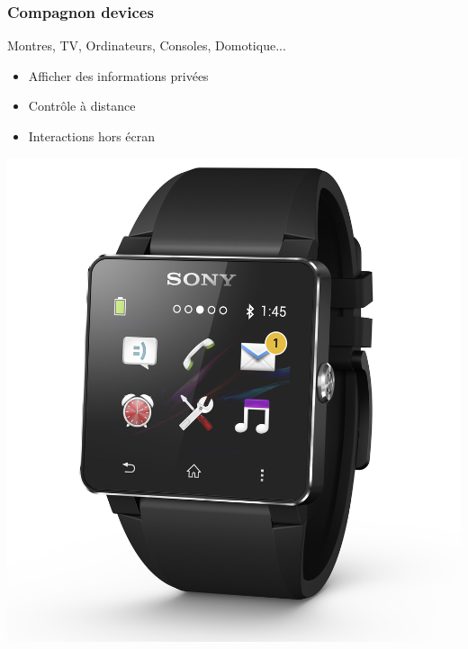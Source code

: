 \documentclass{beamer}
\begin{document}
\begin{frame}
\frametitle{Compagnon devices}

Montres, TV, Ordinateurs, Consoles, Domotique...

\begin{itemize}
		\item Afficher des informations privées
		\item Contrôle à distance
		\item Interactions hors écran
\end{itemize}

\begin{center}
\includegraphics[scale=0.04]{montre.jpg}
\end{center}
\end{frame}
\end{document}

